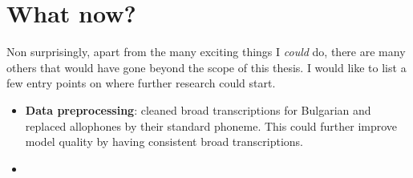 \label{chap:6_conclusion}


\section{What now?}
Non surprisingly, apart from the many exciting things I \textit{could} do, there are many others that would have gone beyond the scope of this thesis. I would like to list a few entry points on where further research could start. 

\begin{itemize}
\item \textbf{Data preprocessing}: \cite{Ashby&Bartley.2021} cleaned broad transcriptions for Bulgarian and replaced allophones by their standard phoneme. This could further improve model quality by having consistent broad transcriptions.
\item 
\end{itemize}